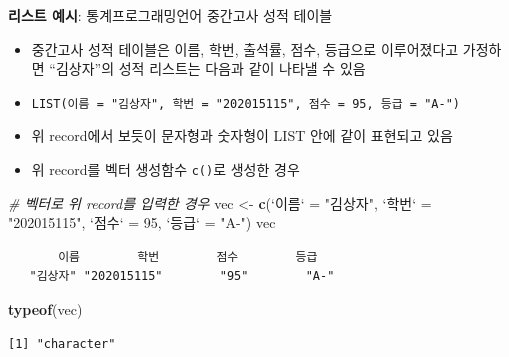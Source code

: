 \documentclass[
  11pt,
]{krantz}
\newenvironment{Shaded}{\begin{snugshade}}{\end{snugshade}}
\newcommand{\CommentTok}[1]{\textcolor[rgb]{0.37,0.37,0.37}{\textit{#1}}}
\newcommand{\DataTypeTok}[1]{\textcolor[rgb]{0.27,0.27,0.27}{#1}}
\newcommand{\DecValTok}[1]{\textcolor[rgb]{0.06,0.06,0.06}{#1}}
\newcommand{\KeywordTok}[1]{\textcolor[rgb]{0.27,0.27,0.27}{\textbf{#1}}}
\newcommand{\NormalTok}[1]{#1}
\newcommand{\StringTok}[1]{\textcolor[rgb]{0.5,0.5,0.5}{#1}}
\providecommand{\tightlist}{%
  \setlength{\itemsep}{0pt}\setlength{\parskip}{0pt}}
\let\BeginKnitrBlock\begin \let\EndKnitrBlock\end
\begin{document}
\footnotesize

\BeginKnitrBlock{rmdnote}
\textbf{리스트 예시}: 통계프로그래밍언어 중간고사 성적 테이블

\begin{itemize}
\tightlist
\item
  중간고사 성적 테이블은 이름, 학번, 출석률, 점수, 등급으로 이루어졌다고 가정하면 ``김상자''의 성적 리스트는 다음과 같이 나타낼 수 있음
\item
  \texttt{LIST(이름\ =\ "김상자",\ 학번\ =\ "202015115",\ 점수\ =\ 95,\ 등급\ =\ "A-")}
\item
  위 record에서 보듯이 문자형과 숫자형이 LIST 안에 같이 표현되고 있음
\end{itemize}
\EndKnitrBlock{rmdnote}

\normalsize

\begin{itemize}
\tightlist
\item
  위 record를 벡터 생성함수 \texttt{c()}로 생성한 경우
\end{itemize}

\footnotesize

\begin{Shaded}
\begin{Highlighting}[]
\CommentTok{# 벡터로 위 record를 입력한 경우}
\NormalTok{vec <-}\StringTok{ }\KeywordTok{c}\NormalTok{(}\StringTok{`}\DataTypeTok{이름}\StringTok{`}\NormalTok{ =}\StringTok{ "김상자"}\NormalTok{, }\StringTok{`}\DataTypeTok{학번}\StringTok{`}\NormalTok{ =}\StringTok{ "202015115"}\NormalTok{, }
         \StringTok{`}\DataTypeTok{점수}\StringTok{`}\NormalTok{ =}\StringTok{ }\DecValTok{95}\NormalTok{, }\StringTok{`}\DataTypeTok{등급}\StringTok{`}\NormalTok{ =}\StringTok{ "A-"}\NormalTok{)}
\NormalTok{vec}
\end{Highlighting}
\end{Shaded}

\begin{verbatim}
       이름        학번        점수        등급 
   "김상자" "202015115"        "95"        "A-" 
\end{verbatim}

\begin{Shaded}
\begin{Highlighting}[]
\KeywordTok{typeof}\NormalTok{(vec)}
\end{Highlighting}
\end{Shaded}

\begin{verbatim}
[1] "character"
\end{verbatim}
\end{document}

